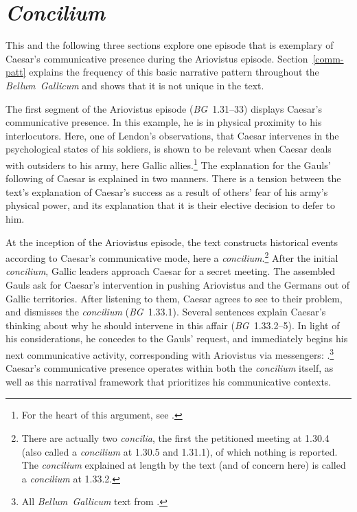 \documentclass[12pt,letterpaper,oneside,final]{memoir}
\begin{document}
\section{\emph{Concilium}}
\label{bg-concilium}

This and the following three sections explore one episode that is exemplary of Caesar's communicative presence during the Ariovistus episode. Section~\ref{comm-patt} explains the frequency of this basic narrative pattern throughout the \emph{Bellum~Gallicum} and shows that it is not unique in the text.

The first segment of the Ariovistus episode (\emph{BG}~1.31--33) displays Caesar's communicative presence. In this example, he is in physical proximity to his interlocutors. Here, one of Lendon's observations, that Caesar intervenes in the psychological states of his soldiers, is shown to be relevant when Caesar deals with outsiders to his army, here Gallic allies.\footnote{For the heart of this argument, see \textcite[pp.~295--304 on \emph{animus} and pp.~306--316 on \emph{virtus}]{lendon1999}.} The explanation for the Gauls' following of Caesar is explained in two manners. There is a tension between the text's explanation of Caesar's success as a result of others' fear of his army's physical power, and its explanation that it is their elective decision to defer to him.

At the inception of the Ariovistus episode, the text constructs historical events according to Caesar's communicative mode, here a \emph{concilium}.\footnote{There are actually two \emph{concilia}, the first the petitioned meeting at 1.30.4 (also called a \emph{concilium} at 1.30.5 and 1.31.1), of which nothing is reported. The \emph{concilium} explained at length by the text (and of concern here) is called a \emph{concilium} at 1.33.2.} After the initial \emph{concilium}, Gallic leaders approach Caesar for a secret meeting. The assembled Gauls ask for Caesar's intervention in pushing Ariovistus and the Germans out of Gallic territories. After listening to them, Caesar agrees to see to their problem, and dismisses the \emph{concilium} (\emph{BG}~1.33.1). Several sentences explain Caesar's thinking about why he should intervene in this affair (\emph{BG}~1.33.2--5). In light of his considerations, he concedes to the Gauls' request, and immediately begins his next communicative activity, corresponding with Ariovistus via messengers: .\footnote{All \emph{Bellum~Gallicum} text from \textcite{hering2008}.} Caesar's communicative presence operates within both the \emph{concilium} itself, as well as this narratival framework that prioritizes his communicative contexts.
\end{document}

